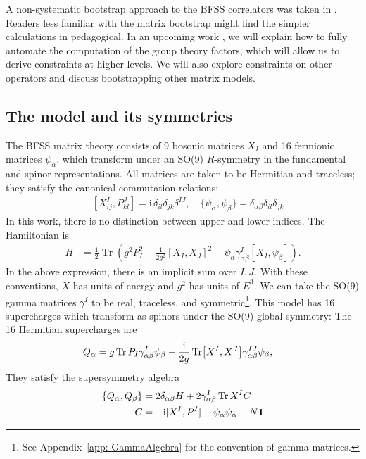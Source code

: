 \documentclass[11pt]{article}
\def\la{\label}
\newcommand{\hf}{\frac{1}{2}}
\def\i{\mathrm{i}}
\begin{document}
A non-systematic bootstrap approach to the BFSS correlators was taken in \cite{Lin:2023owt}. Readers less familiar with the matrix bootstrap might find the simpler calculations in \cite{Lin:2023owt} pedagogical. In an upcoming work \cite{LinZheng2}, we will explain how to fully automate the computation of the group theory factors, which will allow us to derive constraints at higher levels. We will also explore constraints on other operators and discuss bootstrapping other matrix models. %

\subsection{The model and its symmetries}
The BFSS matrix theory consists of 9 bosonic matrices $X_I$ and 16 fermionic matrices $\psi_\alpha$, which transform under an SO(9) $R$-symmetry in the fundamental and spinor representations.  All matrices are taken to be Hermitian and traceless; they satisfy the canonical commutation relations:
\begin{equation}
\begin{split}
\label{canonical}
 \quad [X^I_{ij},P^J_{kl}] = \i \, \delta_{il} \delta_{jk} \delta^{IJ} , \quad \{  \psi_\alpha , \psi_\beta \} =   \delta_{\alpha \beta}  \delta_{il} \delta_{jk}   %
\end{split}
\end{equation}
In this work, there is no distinction between upper and lower indices.
The Hamiltonian is
\begin{align}\la{ham}
H &= \hf  \operatorname{Tr}  \left(g^2   {P_I^2}-\frac{1}{2g^2}\left[X_I, X_J\right]^2-\psi_\alpha \gamma^I_{\alpha \beta} \left[ X_I,\psi_\beta\right] \right) .
\end{align}
In the above expression, there is an implicit sum over $I,J$. 
With these conventions, $X$ has units of energy and $g^2$ has units of $E^{3}$.
We can take the SO(9) gamma matrices $\gamma^I$ to be real, traceless, and symmetric\footnote{See Appendix~\ref{app: GammaAlgebra} for the convention of gamma matrices.}.
This model has 16 supercharges which transform as spinors under the SO(9) global symmetry:
The 16 Hermitian supercharges are
\begin{align} \label{eq:susy}
    Q_\alpha &= g \Tr P_I \gamma^{I}_{\alpha \beta} \psi_\beta - \frac{\i}{2g} \Tr [X^I, X^J]\gamma^{IJ}_{\alpha \beta}\psi_\beta,
\end{align}
They satisfy the supersymmetry algebra
\begin{align}\label{eq: gaugegen}
    \{Q_\alpha, Q_\beta\} &= 2 \delta_{\alpha \beta} H +2 \gamma^I_{\alpha \beta} \Tr X^I C\\
    C &= -\i [X^I, P^I]-\psi_{\alpha} \psi_{\alpha} - N {\bf 1}
\end{align}
\end{document}
